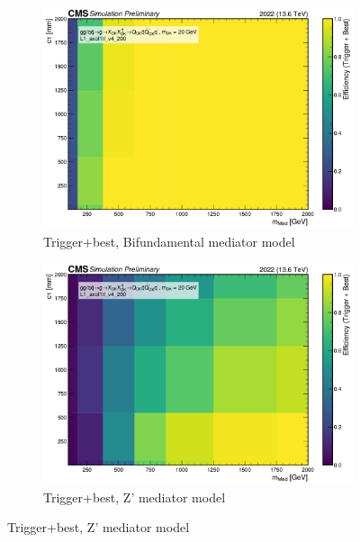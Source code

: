 \begin{figure}[h]
  \vspace{1em}

  \begin{subfigure}[t]{0.45\textwidth}
    \centering
    \includegraphics[width=\linewidth]{images/L1/ad_2D_tchan/trigeffplots2D_L1_efftype-trigplusbest_t-channel_mDark-20_L1_axol1tl_v4_200_study_cloppear.pdf}
    \caption{Trigger+best, Bifundamental mediator model}
    \label{fig:axol1tl_trigplusbest_tchan}
  \end{subfigure}
  \hfill
  \begin{subfigure}[t]{0.45\textwidth}
    \centering
    \includegraphics[width=\linewidth]{images/L1/ad_2D_schan/trigeffplots2D_L1_efftype-trigplusbest_s-channel_mDark-20_L1_axol1tl_v4_200_study_cloppear.pdf}
    \caption{Trigger+best, Z' mediator model}
    \label{fig:axol1tl_trigplusbest_schan}
  \end{subfigure}


\end{figure}
